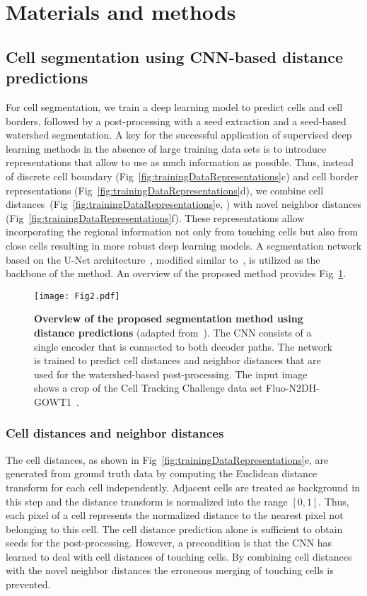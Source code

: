 \documentclass[10pt,letterpaper]{article}
\begin{document}
\section*{Materials and methods}
\subsection*{Cell segmentation using CNN-based distance predictions}
For cell segmentation, we train a deep learning model to predict cells and cell borders, followed by a post-processing with a seed extraction and a seed-based watershed segmentation. A key for the successful application of supervised deep learning methods in the absence of large training data sets is to introduce representations that allow to use as much information as possible. Thus, instead of discrete cell boundary (Fig~\ref{fig:trainingDataRepresentations}c) and cell border representations (Fig~\ref{fig:trainingDataRepresentations}d), we combine cell distances~(Fig~\ref{fig:trainingDataRepresentations}e, \cite{Li2019}) with novel neighbor distances (Fig~\ref{fig:trainingDataRepresentations}f). These representations allow incorporating the regional information not only from touching cells but also from close cells resulting in more robust deep learning models. A segmentation network based on the U-Net architecture~\cite{Ronneberger2015}, modified similar to~\cite{Li2019}, is utilized as the backbone of the method. An overview of the proposed method provides Fig~\ref{fig:architecture}.
\begin{figure}
\begin{adjustwidth}{-2.25in}{0in}
\centering
\texttt{[image: Fig2.pdf]}
\caption{\textbf{Overview of the proposed segmentation method using distance predictions} (adapted from~\cite{Li2019}). The CNN consists of a single encoder that is connected to both decoder paths. The network is trained to predict cell distances and neighbor distances that are used for the watershed-based post-processing. The input image shows a crop of the Cell Tracking Challenge data set Fluo-N2DH-GOWT1~\cite{Ulman2017, Maska2014}.}
\label{fig:architecture}
\end{adjustwidth}
\end{figure}

\subsubsection*{Cell distances and neighbor distances}
The cell distances, as shown in Fig~\ref{fig:trainingDataRepresentations}e, are generated from ground truth data by computing the Euclidean distance transform for each cell independently. Adjacent cells are treated as background in this step and the distance transform is normalized into the range $[0, 1]$. Thus, each pixel of a cell represents the normalized distance to the nearest pixel not belonging to this cell. The cell distance prediction alone is sufficient to obtain seeds for the post-processing. However, a precondition is that the CNN has learned to deal with cell distances of touching cells. By combining cell distances with the novel neighbor distances the erroneous merging of touching cells is prevented.
\end{document}
